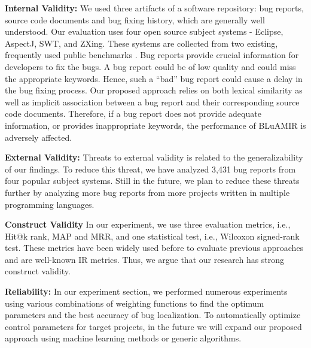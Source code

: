 \documentclass[sigconf,review,anonymous]{acmart}
\begin{document}
\textbf{Internal Validity:} We used three artifacts of a software repository: bug reports, source code documents and bug fixing history, which are generally well understood. Our evaluation uses four open source subject systems - Eclipse, AspectJ, SWT, and ZXing. These systems are collected from two existing, frequently used public benchmarks \cite{Jian, Saha}. 
Bug reports provide crucial information for developers to fix the bugs.
A bug report could be of low quality and could miss the appropriate keywords.
Hence, such a “bad” bug report could cause a delay in the bug fixing process. Our proposed approach relies on both lexical similarity as well as implicit association between a bug report and their corresponding source code documents. Therefore, if a bug report does not provide adequate information, or provides inappropriate keywords, the performance of BLuAMIR is adversely affected.

\textbf{External Validity:} 
Threats to external validity is related to the generalizability of our findings. 
To reduce this threat, we have analyzed 3,431 bug reports from four popular subject systems.  
Still in the future, we plan to reduce these threats further by analyzing more bug reports from more projects written in multiple programming languages.


\textbf{Construct Validity}
In our experiment, we use three evaluation metrics, i.e., Hit@k rank, MAP and MRR, and one statistical test, i.e., Wilcoxon signed-rank test. These metrics have been widely used before to evaluate previous approaches \cite{Jian, Saha} and are well-known IR metrics. Thus, we argue that our research has strong construct validity.

\textbf{Reliability:}
In our experiment section, we performed numerous experiments using various combinations of weighting functions to find the optimum parameters and the best accuracy of bug localization. 
To automatically optimize control parameters for target projects, in the future we will expand our proposed approach using machine learning methods or generic algorithms.
\end{document}
